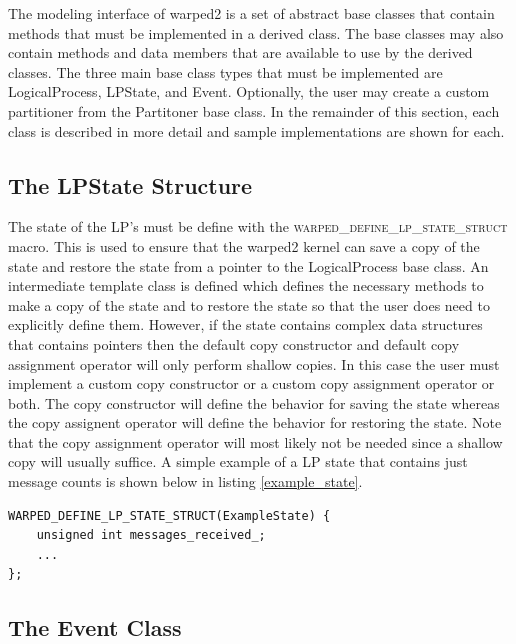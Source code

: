 \documentclass[11pt]{book}
\begin{document}
The modeling interface of warped2 is a set of abstract base classes that contain methods
that must be implemented in a derived class. The base classes may also contain methods and
data members that are available to use by the derived classes. The three main base class
types that must be implemented are LogicalProcess, LPState, and Event. Optionally, the user
may create a custom partitioner from the Partitoner base class. In the remainder of this
section, each class is described in more detail and sample implementations are shown for each.

\subsection{The LPState Structure}

The state of the LP's must be define with the \textsc{warped\_define\_lp\_state\_struct}
macro. This is used to ensure that the warped2 kernel can save a copy of the state and
restore the state from a pointer to the LogicalProcess base class. An intermediate template
class is defined which defines the necessary methods to make a copy of the state and to
restore the state so that the user does need to explicitly define them. However, if the
state contains complex data structures that contains pointers then the default copy
constructor and default copy assignment operator will only perform shallow copies. In this
case the user must implement a custom copy constructor or a custom copy assignment operator
or both. The copy constructor will define the behavior for saving the state whereas the
copy assignent operator will define the behavior for restoring the state. Note that the
copy assignment operator will most likely not be needed since a shallow copy will usually
suffice. A simple example of a LP state that contains just message counts is shown
below in listing \ref{example_state}.

\begin{lstlisting}[caption=Example \textsc{warped2} State Definition, label=example_state, float]
WARPED_DEFINE_LP_STATE_STRUCT(ExampleState) {
    unsigned int messages_received_;
    ...
};
\end{lstlisting}

\subsection{The Event Class}
\end{document}
